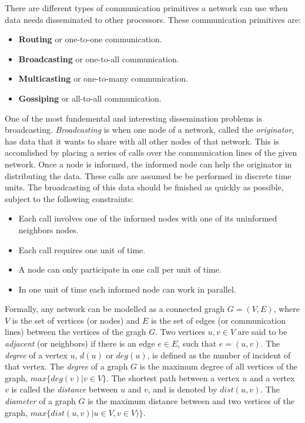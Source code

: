 There are different types of communication primitives a network can use when data needs disseminated to other processors. These communication primitives are:
\begin{itemize}
    \item \textbf{Routing} or one-to-one communication.
    \item \textbf{Broadcasting} or one-to-all communication.
    \item \textbf{Multicasting} or one-to-many communication.
    \item \textbf{Gossiping} or all-to-all communication.
\end{itemize}

One of the most fundemental and interesting dissemination problems is broadcasting. \textit{Broadcasting} is when one node of a network, called the \textit{originator}, has data that it wants to share with all other nodes of that network. This is accomlished by placing a series of calls over the communication lines of the given network. Once a node is informed, the informed node can help the originator in distributing the data. These calls are assumed be be performed in discrete time units. The broadcasting of this data should be finished as quickly as possible, subject to the following constraints:
\begin{itemize}
    \item Each call involves one of the informed nodes with one of its uninformed neighbors nodes.
    \item Each call requires one unit of time.
    \item A node can only participate in one call per unit of time.
    \item In one unit of time each informed node can work in parallel.
\end{itemize}

Formally, any network can be modelled as a connected gragh $G = (V, E)$, where $V$ is the set of vertices (or nodes) and $E$ is the set of edges (or communication lines) between the vertices of the gragh $G$. Two vertices $u, v \in V$ are said to be \textit{adjacent} (or neighbors) if there is an edge $e \in E$, such that $e = (u, v)$. The \textit{degree} of a vertex $u$, $d(u)$ or $deg(u)$, is defined as the number of incident of that vertex. The \textit{degree} of a graph $G$ is the maximum degree of all vertices of the graph, $max\{deg(v) | v \in V\}$. The shortest path between a vertex $u$ and a vertex $v$ is called the \textit{distance} between $u$ and $v$, and is denoted by $dist(u, v)$. The \textit{diameter} of a graph $G$ is the maximum distance between and two vertices of the graph, $max\{dist(u, v) | u \in V, v \in V)\}$.


